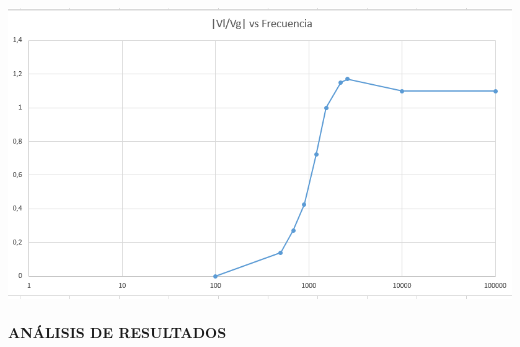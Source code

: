 \documentclass[12pt]{article}
\begin{document}
\begin{enumerate}
\begin{itemize}
    		\begin{center}
    			\includegraphics[width=16cm,height=8cm]{Img/graph_4}
    		\end{center}
    		
    	\end{itemize}
    	
    \end{enumerate}
    
    \newpage
    
    \begin{center}
    	\textbf{\large ANÁLISIS DE RESULTADOS}\\
    \end{center}
    
    \renewcommand{\theenumi}{\alph{enumi}} %
    
\end{document}

